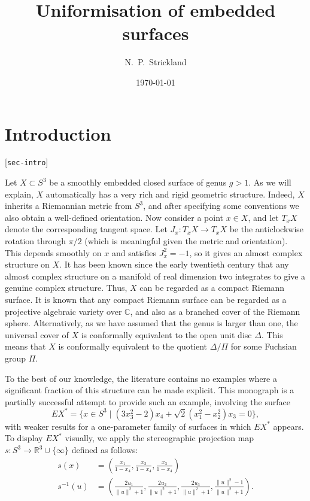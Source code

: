 \documentclass[reqno]{amsart}
\newcommand{\lbl}[1]{\label{#1}\textup{[\texttt{#1}]}\par}
\newcommand{\lbl}{\label}
\newcommand{\Dl}        {\Delta}
\newcommand{\R}         {{\mathbb{R}}}
\newcommand{\C}         {{\mathbb{C}}}
\newcommand{\st}        {\;|\;}
\newcommand{\rt}        {\sqrt{2}}
\renewcommand{\:}{\colon}
\theoremstyle{definition}
\begin{document}
\title{Uniformisation of embedded surfaces}
\author{N.~P.~Strickland}
\date{\today}


\maketitle
\tableofcontents

\section{Introduction}
\lbl{sec-intro}

Let $X\subset S^3$ be a smoothly embedded closed surface of genus
$g>1$.  As we will explain, $X$ automatically has a very rich and
rigid geometric structure.  Indeed, $X$ inherits a Riemannian metric
from $S^3$, and after specifying some conventions we also obtain a
well-defined orientation.  Now consider a point $x\in X$, and let
$T_xX$ denote the corresponding tangent space.  Let $J_x\:T_xX\to
T_xX$ be the anticlockwise rotation through $\pi/2$ (which is
meaningful given the metric and orientation).  This depends smoothly
on $x$ and satisfies $J_x^2=-1$, so it gives an almost complex
structure on $X$.  It has been known since the early twentieth century
that any almost complex structure on a manifold of real dimension two
integrates to give a genuine complex structure.  Thus, $X$ can be
regarded as a compact Riemann surface.  It is known that any compact
Riemann surface can be regarded as a projective algebraic variety over
$\C$, and also as a branched cover of the Riemann sphere.
Alternatively, as we have assumed that the genus is larger than one,
the universal cover of $X$ is conformally equivalent to the open unit
disc $\Dl$.  This means that $X$ is conformally equivalent to the
quotient $\Dl/\Pi$ for some Fuchsian group $\Pi$.

To the best of our knowledge, the literature contains no examples
where a significant fraction of this structure can be made explicit.
This monograph is a partially successful attempt to provide such
an example, involving the surface
\[ EX^* = \{x\in S^3\st
              (3x_3^2-2)x_4+\rt(x_1^2-x_2^2)x_3=0
         \},
\]
with weaker results for a one-parameter family of surfaces in which
$EX^*$ appears.  To display $EX^*$ visually, we apply the
stereographic projection map $s\:S^3\to\R^3\cup\{\infty\}$ defined as
follows:
\begin{align*}
 s(x) &=
  \left(\frac{x_1}{1-x_4},\frac{x_2}{1-x_4},\frac{x_3}{1-x_4}\right)
  \\
 s^{-1}(u) &=
  \left(\frac{2u_1}{\|u\|^2+1},
        \frac{2u_2}{\|u\|^2+1},
        \frac{2u_3}{\|u\|^2+1},
        \frac{\|u\|^2-1}{\|u\|^2+1}\right).
\end{align*}
\end{document}
